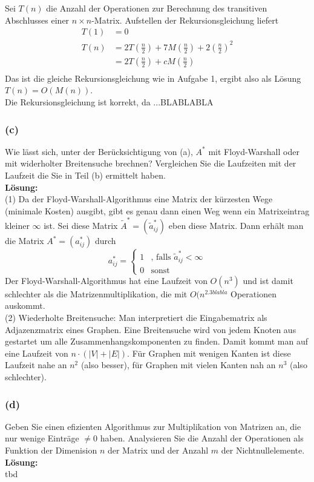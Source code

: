\documentclass[11pt,a4paper,ngerman]{article}
\begin{document}
Sei $T(n)$ die Anzahl der Operationen zur Berechnung des transitiven Abschlusses einer $n \times n$-Matrix.
Aufstellen der Rekursionsgleichung liefert
\begin{equation*}\begin{split}
T(1) &= 0 \\
T(n) &= 2T\left(\frac{n}{2} \right) + 7M(\frac{n}{2}) + 2\left(\frac{n}{2}\right)^2 \\
     &= 2T\left(\frac{n}{2} \right) + cM(\frac{n}{2})  \\
\end{split}\end{equation*}
Das ist die gleiche Rekursionsgleichung wie in Aufgabe 1, ergibt also als Lösung $T(n) = O(M(n))$. \\

Die Rekursionsgleichung ist korrekt, da ...BLABLABLA
\subsubsection*{(c)}
Wie lässt sich, unter der Berücksichtigung von (a), $A^*$ mit Floyd-Warshall oder mit widerholter Breitensuche brechnen?
Vergleichen Sie die Laufzeiten mit der Laufzeit die Sie in Teil (b) ermittelt haben.\\

\textbf{Lösung:}\\
(1) Da der Floyd-Warshall-Algorithmus eine Matrix der kürzesten Wege (minimale Kosten) ausgibt, gibt es
genau dann einen Weg wenn ein Matrixeintrag kleiner $\infty$ ist.
Sei diese Matrix $\tilde{A}^* = (\tilde{a}^*_{ij})$ eben diese Matrix. Dann erhält man die Matrix $A^* = (a^*_{ij})$ durch
\begin{equation*}
a^*_{ij} = \begin{cases}
              1 & \text{, falls $\tilde{a}^*_{ij} < \infty$} \\
              0 & \text{sonst}
            \end{cases}
\end{equation*}
Der Floyd-Warshall-Algorithmus hat eine Laufzeit von $O(n^3)$ und ist damit schlechter als die Matrizenmultiplikation, die mit $O(n^{2.3blabla}$ Operationen auskommt.\\
(2) Wiederholte Breitensuche:  Man interpretiert die Eingabematrix als Adjazenzmatrix eines Graphen. Eine Breitensuche wird von jedem Knoten aus gestartet um alle
Zusammenhangskomponenten zu finden. Damit kommt man auf eine Laufzeit von $n \cdot (|V| +|E|)$.
Für Graphen mit wenigen Kanten ist diese Laufzeit nahe an $n^2$ (also besser), für Graphen mit vielen Kanten nah an $n^3$ (also schlechter).
\subsubsection*{(d)}

Geben Sie einen efizienten Algorithmus zur Multiplikation von Matrizen an, die nur wenige Einträge $\not= 0$ haben. Analysieren Sie die Anzahl der Operationen
als Funktion der Dimenision $n$ der Matrix und der Anzahl $m$ der Nichtnullelemente.\\

\textbf{Lösung:}\\
tbd

\label{LastPage}
\end{document}
